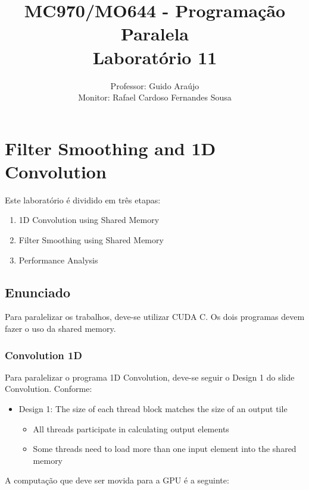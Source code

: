 \documentclass[12pt,a4paper,notitlepage]{report}
\begin{document}
\renewcommand{\chaptername}{}
\renewcommand{\thechapter}{}

\title{MC970/MO644 - Programação Paralela\\
		Laboratório 11}
\author{Professor: Guido Araújo \\
	Monitor: Rafael Cardoso Fernandes Sousa}
\date{}

\maketitle

\chapter{Filter Smoothing and 1D Convolution}

Este laboratório é dividido em três etapas:
\begin{enumerate}  
\item 1D Convolution using Shared Memory
\item Filter Smoothing using Shared Memory
\item Performance Analysis
\end{enumerate}

\section*{Enunciado}

Para paralelizar os trabalhos, deve-se utilizar CUDA C. Os dois programas devem fazer o uso da shared memory.

\subsection*{Convolution 1D}

Para paralelizar o programa 1D Convolution, deve-se seguir o Design 1 do slide Convolution. Conforme:
\begin{itemize}
\item Design 1: The size of each thread block matches the size of an output tile
\begin{itemize}
\item All threads participate in calculating output elements
\item Some threads need to load more than one input element into the shared memory
\end{itemize}
\end{itemize}


A computação que deve ser movida para a GPU é a seguinte:
\end{document}
